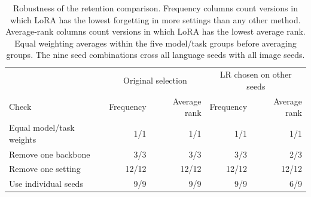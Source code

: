 \begin{table}[!htbp]
\caption{Robustness of the retention comparison. Frequency columns count versions in which LoRA has the lowest forgetting in more settings than any other method. Average-rank columns count versions in which LoRA has the lowest average rank. Equal weighting averages within the five model/task groups before averaging groups. The nine seed combinations cross all language seeds with all image seeds.}
\label{tab:retention-robustness}
\begin{center}
\begin{tabular*}{\linewidth}{@{\extracolsep{\fill}}lrrrr@{}}\toprule
& \multicolumn{2}{c}{Original selection} & \multicolumn{2}{c}{LR chosen on other seeds}\\Check & Frequency & Average rank & Frequency & Average rank\\\midrule
Equal model/task weights & 1/1 & 1/1 & 1/1 & 1/1 \\
Remove one backbone & 3/3 & 3/3 & 3/3 & 2/3 \\
Remove one setting & 12/12 & 12/12 & 12/12 & 12/12 \\
Use individual seeds & 9/9 & 9/9 & 9/9 & 6/9 \\
\bottomrule\end{tabular*}
\end{center}
\end{table}
